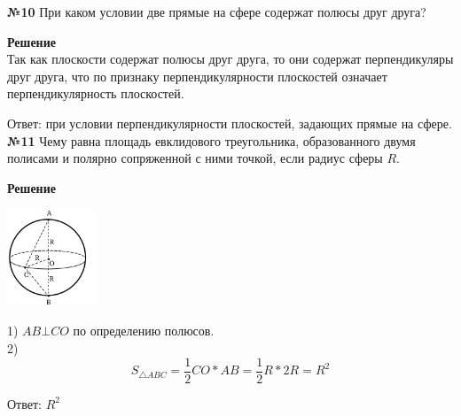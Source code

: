     \textbf{№10}
    При каком условии две прямые на сфере содержат полюсы друг друга?

    \textbf{Решение}\\

    Так как плоскости содержат полюсы друг друга, то они содержат перпендикуляры друг друга,
    что по признаку перпендикулярности плоскостей означает перпендикулярность плоскостей.

    Ответ: при условии перпендикулярности плоскостей, задающих прямые на сфере.\\


    \textbf{№11}
    Чему равна площадь евклидового треугольника, образованного двумя полисами и полярно сопряженной с ними точкой,
    если радиус сферы $R$.

    \textbf{Решение}\\

    \begin{center}
        \includegraphics[width=0.2\textwidth]{images/img6}\\
    \end{center}

    1) $AB \bot CO$ по определению полюсов.\\

    2)\[
          S_{\triangle ABC} = \frac{1}{2} CO * AB = \frac{1}{2} R * 2R = R ^ 2
    \]

    Ответ: $R ^ 2$\\






